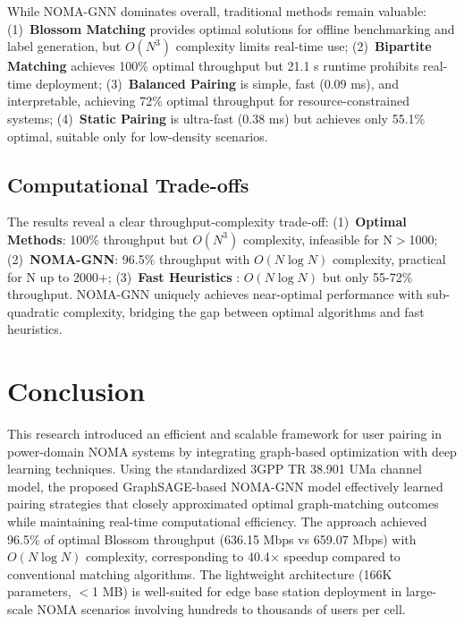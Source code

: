 \documentclass[conference]{IEEEtran}
\begin{document}
While NOMA-GNN dominates overall, traditional methods remain valuable: (1)~\textbf{Blossom Matching} provides optimal solutions for offline benchmarking and label generation, but $O(N^3)$ complexity limits real-time use; (2)~\textbf{Bipartite Matching}  achieves 100\% optimal throughput but 21.1 s runtime prohibits real-time deployment; (3)~\textbf{Balanced Pairing}  is simple, fast (0.09 ms), and interpretable, achieving 72\% optimal throughput for resource-constrained systems; (4)~\textbf{Static Pairing}  is ultra-fast (0.38 ms) but achieves only 55.1\% optimal, suitable only for low-density scenarios.

\subsection{Computational Trade-offs}

The results reveal a clear throughput-complexity trade-off: (1)~\textbf{Optimal Methods}: 100\% throughput but $O(N^3)$ complexity, infeasible for N$>$1000; (2)~\textbf{NOMA-GNN}: 96.5\% throughput with $O(N \log N)$ complexity, practical for N up to 2000+; (3)~\textbf{Fast Heuristics} : $O(N \log N)$ but only 55-72\% throughput. NOMA-GNN uniquely achieves near-optimal performance with sub-quadratic complexity, bridging the gap between optimal algorithms and fast heuristics.



\section{Conclusion}
This research introduced an efficient and scalable framework for user pairing in power-domain NOMA systems by integrating graph-based optimization with deep learning techniques. Using the standardized 3GPP TR 38.901 UMa channel model, the proposed GraphSAGE-based NOMA-GNN model effectively learned pairing strategies that closely approximated optimal graph-matching outcomes while maintaining real-time computational efficiency. The approach achieved 96.5\% of optimal Blossom throughput (636.15 Mbps vs 659.07 Mbps) with $O(N\log N)$ complexity, corresponding to 40.4$\times$ speedup compared to conventional matching algorithms. The lightweight architecture (166K parameters, $<$1 MB) is well-suited for edge base station deployment in large-scale NOMA scenarios involving hundreds to thousands of users per cell.
\end{document}
